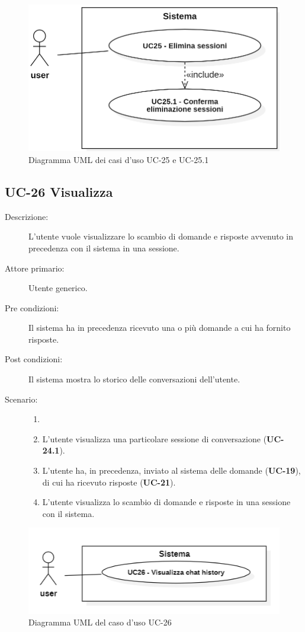 \begin{figure}[H]
    \centering
    \includegraphics[width=0.8\linewidth]{UC25.png} 
    \caption{Diagramma UML dei casi d'uso UC-25 e UC-25.1}
    \label{fig:UC25}
\end{figure}

\subsection{UC-26 Visualizza }
\begin{description}
    \item[Descrizione:] L'utente vuole visualizzare lo scambio di domande e risposte avvenuto in precedenza con il sistema in una sessione.
    \item[Attore primario:] Utente generico.
    \item[Pre condizioni:] Il sistema ha in precedenza ricevuto una o più domande a cui ha fornito risposte.
    \item[Post condizioni:] Il sistema mostra lo storico delle conversazioni dell'utente.
    \item[Scenario:]
    \begin{enumerate}
        \item[]
        \item L'utente visualizza una particolare sessione di conversazione (\textbf{UC-24.1}).
        \item L'utente ha, in precedenza, inviato al sistema delle domande (\textbf{UC-19}), di cui ha ricevuto risposte (\textbf{UC-21}).
        \item L'utente visualizza lo scambio di domande e risposte in una sessione con il sistema.
    \end{enumerate}
    
\end{description} 

\begin{figure}[H]
    \centering
    \includegraphics[width=0.9\linewidth]{UC26.PNG}
    \caption{Diagramma UML del caso d'uso UC-26}
    \label{fig:UC26}
\end{figure}

